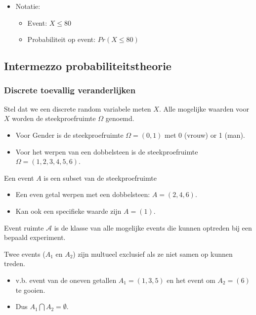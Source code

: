 \documentclass[
  12pt,dutch,coursenotes]{book}
\providecommand{\tightlist}{%
  \setlength{\itemsep}{0pt}\setlength{\parskip}{0pt}}
\theoremstyle{definition}
\theoremstyle{definition}
\theoremstyle{definition}
\theoremstyle{remark}
\begin{document}
\begin{itemize}
\item
  Notatie:

  \begin{itemize}
  \tightlist
  \item
    Event: \(X \leq 80\)
  \item
    Probabiliteit op event: \(Pr(X \leq 80)\)
  \end{itemize}
\end{itemize}

\hypertarget{intermezzo-probabiliteitstheorie}{%
\subsection{Intermezzo probabiliteitstheorie}\label{intermezzo-probabiliteitstheorie}}

\hypertarget{discrete-toevallig-veranderlijken}{%
\subsubsection{Discrete toevallig veranderlijken}\label{discrete-toevallig-veranderlijken}}

Stel dat we een discrete random variabele meten \(X\). Alle mogelijke waarden voor \(X\) worden de steekproefruimte \(\Omega\) genoemd.

\begin{itemize}
\item
  Voor Gender is de steekproefruimte \(\Omega=(0,1)\) met 0 (vrouw) or 1 (man).
\item
  Voor het werpen van een dobbelsteen is de steekproefruimte \(\Omega=(1,2,3,4,5,6)\).
\end{itemize}

Een event \(A\) is een subset van de steekproefruimte

\begin{itemize}
\tightlist
\item
  Een even getal werpen met een dobbelsteen: \(A=(2,4,6)\).
\item
  Kan ook een specifieke waarde zijn \(A=(1)\).
\end{itemize}

Event ruimte \(\mathcal{A}\) is de klasse van alle mogelijke events die kunnen optreden bij een bepaald experiment.

Twee events (\(A_1\) en \(A_2\)) zijn multueel exclusief als ze niet samen op kunnen treden.

\begin{itemize}
\tightlist
\item
  v.b. event van de oneven getallen \(A_1=(1,3,5)\) en het event om \(A_2=(6)\) te gooien.
\item
  Dus \(A_1 \bigcap A_2=\emptyset\).
\end{itemize}
\end{document}
